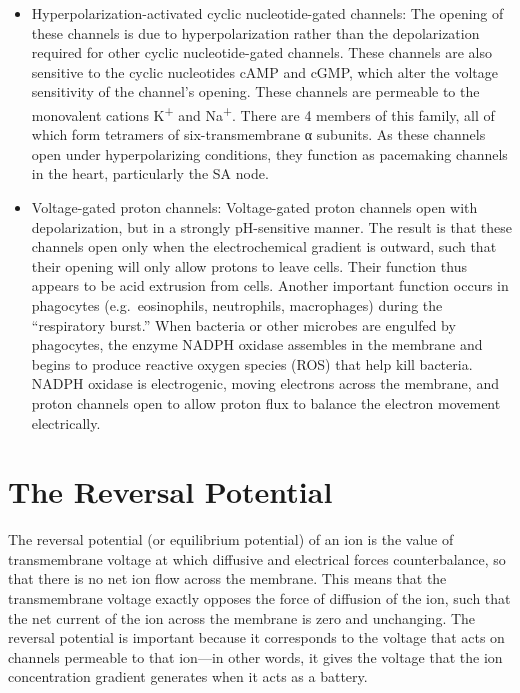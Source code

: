 \documentclass[]{book}
\begin{document}
\begin{itemize}
\item
  Hyperpolarization-activated cyclic nucleotide-gated channels: The opening of these channels is due to hyperpolarization rather than the depolarization required for other cyclic nucleotide-gated channels. These channels are also sensitive to the cyclic nucleotides cAMP and cGMP, which alter the voltage sensitivity of the channel's opening. These channels are permeable to the monovalent cations K\textsuperscript{+} and Na\textsuperscript{+}. There are 4 members of this family, all of which form tetramers of six-transmembrane α subunits. As these channels open under hyperpolarizing conditions, they function as pacemaking channels in the heart, particularly the SA node.
\item
  Voltage-gated proton channels: Voltage-gated proton channels open with depolarization, but in a strongly pH-sensitive manner. The result is that these channels open only when the electrochemical gradient is outward, such that their opening will only allow protons to leave cells. Their function thus appears to be acid extrusion from cells. Another important function occurs in phagocytes (e.g.~eosinophils, neutrophils, macrophages) during the ``respiratory burst.'' When bacteria or other microbes are engulfed by phagocytes, the enzyme NADPH oxidase assembles in the membrane and begins to produce reactive oxygen species (ROS) that help kill bacteria. NADPH oxidase is electrogenic, moving electrons across the membrane, and proton channels open to allow proton flux to balance the electron movement electrically.
\end{itemize}

\hypertarget{the-reversal-potential}{%
\section{The Reversal Potential}\label{the-reversal-potential}}

The reversal potential (or equilibrium potential) of an ion is the value of transmembrane voltage at which diffusive and electrical forces counterbalance, so that there is no net ion flow across the membrane. This means that the transmembrane voltage exactly opposes the force of diffusion of the ion, such that the net current of the ion across the membrane is zero and unchanging. The reversal potential is important because it corresponds to the voltage that acts on channels permeable to that ion---in other words, it gives the voltage that the ion concentration gradient generates when it acts as a battery.
\end{document}
